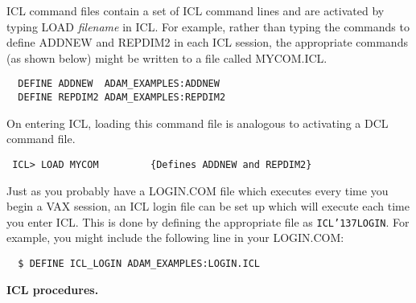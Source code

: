 \documentclass[twoside,11pt]{article}
\renewcommand{\_}{{\tt\char'137}}
\begin{document}
ICL command files contain a set of ICL command lines
and are activated by typing LOAD {\sl filename} in ICL.
For example, rather than typing the commands to define ADDNEW and REPDIM2
in each ICL session, the appropriate commands (as shown below) might be
written to  a file called MYCOM.ICL.
\begin{verbatim}
  DEFINE ADDNEW  ADAM_EXAMPLES:ADDNEW
  DEFINE REPDIM2 ADAM_EXAMPLES:REPDIM2
\end{verbatim}
On entering ICL, loading this command file is analogous to activating a DCL
command file.
\begin{verbatim}
 ICL> LOAD MYCOM         {Defines ADDNEW and REPDIM2}
\end{verbatim}
Just as you probably have a  LOGIN.COM file which  executes every time
you begin a VAX session,
an ICL login file can be set up which will execute each time
you enter ICL.
This is done by defining the appropriate file as {\tt ICL\_LOGIN}.
For example, you might include the following line in your LOGIN.COM:
\begin{verbatim}
  $ DEFINE ICL_LOGIN ADAM_EXAMPLES:LOGIN.ICL
\end{verbatim}


{\large\bf ICL procedures.}
\end{document}
